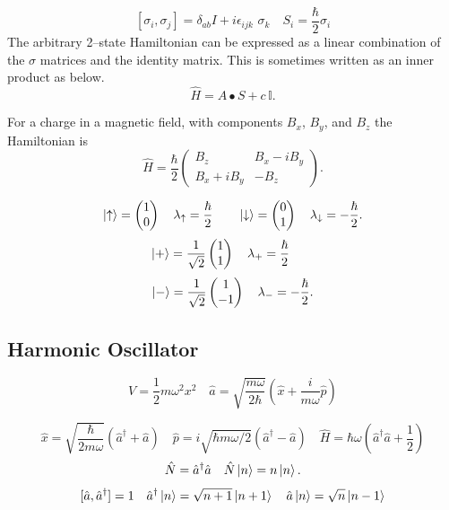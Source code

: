 \documentclass{article}
\begin{document}
      \[ 
      [\sigma_i,\sigma_j] = \delta_{a b}I + i \epsilon_{ijk}\,\,\sigma_k \quad
      S_i = \frac{\hbar}{2}\sigma_i 
    \]
    The arbitrary 2--state Hamiltonian can be expressed as a linear combination
    of the $\sigma$ matrices and the identity matrix. This is sometimes written
    as an inner product as below.
    \[
      \hat{H} = A \bullet S + c\,\mathbb{I}
    .\] 

    For a charge in a magnetic field, with components $B_x$, $B_y$, and $B_z$
    the Hamiltonian is  \[
      \hat{H} =\frac{\hbar}{2} 
      \begin{pmatrix}
        B_z & B_x - i B_y \\ 
        B_x + i B_y  & - B_z
      \end{pmatrix}
    .\] 


      \[
      \ket{\uparrow} =
      \begin{pmatrix}
        1 \\ 
        0
      \end{pmatrix}
      \quad \lambda_\uparrow = \frac{\hbar}{2} \qquad
      \ket{\downarrow} = 
      \begin{pmatrix}
        0 \\ 
        1
      \end{pmatrix} \quad
      \lambda_\downarrow = -\frac{\hbar}{2}
      .\] 
      \[
      \ket{+} = \frac{1}{\sqrt 2}
      \begin{pmatrix}
        1 \\ 
        1
      \end{pmatrix}
      \quad \lambda_+= \frac{\hbar}{2} \qquad
    \]
    \[
      \ket{-} = \frac{1}{\sqrt 2}
      \begin{pmatrix}
        1 \\ 
        -1
      \end{pmatrix} \quad
      \lambda_-= -\frac{\hbar}{2}
      .\] 
      




    \subsection*{Harmonic Oscillator} 
      \[
        V = \frac{1}{2} m \omega^2 x^2 \quad 
        \hat{a} = \sqrt{\frac{m \omega}{2 \hbar}}( \hat{x} + \frac{i}{m \omega}\hat{p})
      \]

      \[
        \hat{x} = \sqrt{\frac{\hbar}{2 m \omega}}(\hat{a}^\dagger + \hat{a}) \quad
        \hat{p} = i \sqrt{\hbar m \omega /2 }(\hat{a}^\dagger - \hat{a}) \quad
        \hat{H} = \hbar \omega(\hat{a}^\dagger\hat{a} + \frac{1}{2})
      \]
      \[
      \hat{N} = \hat{a}^\dagger \hat{a} \quad \hat{N} \ket{n} = n \ket{n} 
      .\]  
      \[
        [\hat{a},\hat{a}^\dagger] = 1 \quad
        \hat{a}^\dagger \ket{n} = \sqrt{n + 1} \ket{n+1} \quad
        \hat{a} \ket{n} = \sqrt{n}\ket{n-1}
      \]
  
\end{document}

